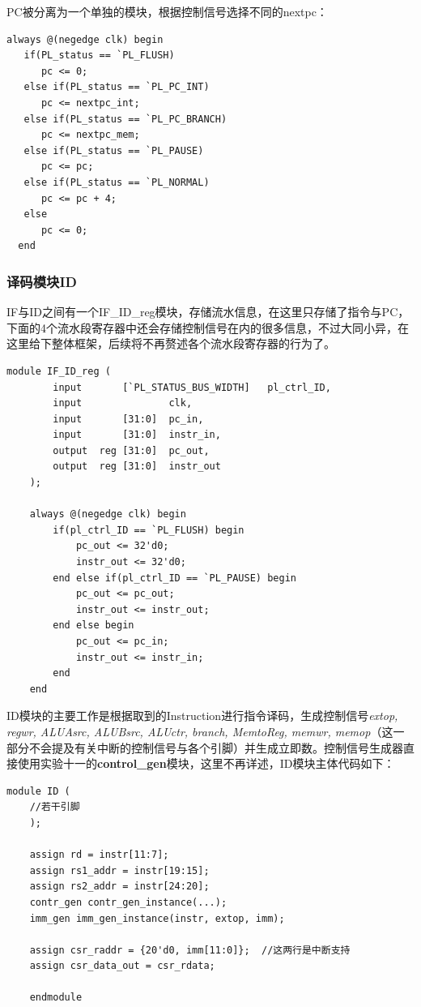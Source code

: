 \documentclass[]{article}
\begin{document}
  PC被分离为一个单独的模块，根据控制信号选择不同的nextpc：
  \begin{lstlisting}[style={verilog-style}]
  always @(negedge clk) begin
   if(PL_status == `PL_FLUSH) 
      pc <= 0;
   else if(PL_status == `PL_PC_INT)
      pc <= nextpc_int;
   else if(PL_status == `PL_PC_BRANCH)
      pc <= nextpc_mem;
   else if(PL_status == `PL_PAUSE)
      pc <= pc;
   else if(PL_status == `PL_NORMAL)
      pc <= pc + 4;
   else
      pc <= 0;
  end
  \end{lstlisting}
  \subsubsection{译码模块ID}
  IF与ID之间有一个IF\_ID\_reg模块，存储流水信息，在这里只存储了指令与PC，下面的4个流水段寄存器中还会存储控制信号在内的很多信息，不过大同小异，在这里给下整体框架，后续将不再赘述各个流水段寄存器的行为了。
  \begin{lstlisting}[style={verilog-style}]
    module IF_ID_reg (
        input       [`PL_STATUS_BUS_WIDTH]   pl_ctrl_ID,
        input               clk,
        input       [31:0]  pc_in,
        input       [31:0]  instr_in,
        output  reg [31:0]  pc_out,
        output  reg [31:0]  instr_out
    );
    
    always @(negedge clk) begin
        if(pl_ctrl_ID == `PL_FLUSH) begin
            pc_out <= 32'd0;
            instr_out <= 32'd0;
        end else if(pl_ctrl_ID == `PL_PAUSE) begin
            pc_out <= pc_out;
            instr_out <= instr_out;
        end else begin
            pc_out <= pc_in;
            instr_out <= instr_in;
        end
    end
  \end{lstlisting}
  
  ID模块的主要工作是根据取到的Instruction进行指令译码，生成控制信号\textit{extop, regwr, ALUAsrc, ALUBsrc, ALUctr, branch, MemtoReg, memwr, memop}（这一部分不会提及有关中断的控制信号与各个引脚）并生成立即数。控制信号生成器直接使用实验十一的\textbf{control\_gen}模块，这里不再详述，ID模块主体代码如下：
  \begin{lstlisting}[style={verilog-style}]
    module ID (
    //若干引脚
    );
    
    assign rd = instr[11:7];
    assign rs1_addr = instr[19:15];
    assign rs2_addr = instr[24:20];
    contr_gen contr_gen_instance(...);
    imm_gen imm_gen_instance(instr, extop, imm);
    
    assign csr_raddr = {20'd0, imm[11:0]};  //这两行是中断支持
    assign csr_data_out = csr_rdata;
        
    endmodule
  \end{lstlisting}
\end{document}
